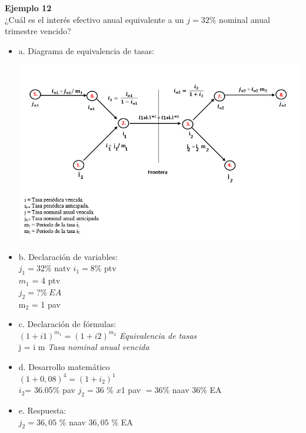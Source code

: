 \textbf{Ejemplo 12}\\

¿Cuál es el interés efectivo anual equivalente a un $j=32\%$ nominal anual trimestre vencido?\\

\begin{itemize}
	\item a. Diagrama de equivalencia de tasas:\\
	
	\begin{center}
	\includegraphics[height = 9.0 cm]{general}\\		
	\end{center}
	
	\item b. Declaración de variables:\\
	
	$j_{1} = 32$\% natv \Rightarrow $i_{1} = 8$\% ptv\\
	$m_{1}$ = 4 ptv\\	
	$j_{2} = ?\%\ EA$\\ 
	m$_{2}$ =  1 pav\\
	
	
	\item c. Declaración de fórmulas:\\
	$(1+i1)^{m_1} = (1+i2)^{m_2}$ \hspace{35 pt} \textit{Equivalencia de tasas}\\
	j = i m \hspace{35 pt} \textit{Tasa nominal  anual vencida}\\
	
	\item d. Desarrollo matemático\\
	$(1+0,08)^{4} = (1+i_{2})^{1}$\\
	$i_{2}$= 36.05\% pav \Rightarrow $j_{2} = 36$ \% $x 1$ pav $= 36$\% naav \equiv $36$\% EA\\
	
	\item e. Respuesta:\\
	$j_{2} = 36,05$ \% naav  \equiv $36,05$ \% EA\\
	
\end{itemize}

